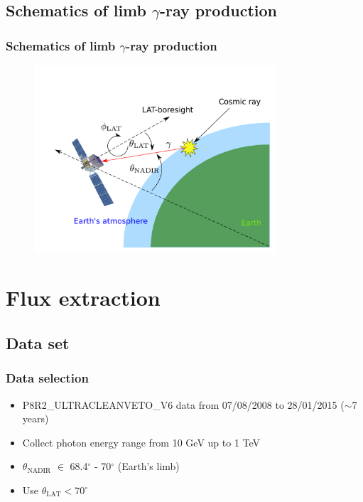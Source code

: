 \documentclass{beamer}
\begin{document}
\subsection{Schematics of limb $\gamma$-ray production}
\begin{frame}
\frametitle{Schematics of limb $\gamma$-ray production}
\centering
\begin{figure}[h!]
\includegraphics[width = 0.8\textwidth]{lat_production_schematic}
\end{figure}
\end{frame}


\section{Flux extraction}
\subsection{Data set}

\begin{frame}
\frametitle{Data selection}
\begin{itemize}
  \item P8R2\_ULTRACLEANVETO\_V6 data from 07/08/2008 to 28/01/2015 ($\sim$7 years) %
  \item Collect photon energy range from 10 GeV up to 1 TeV
  \item $\theta_{\text{NADIR}}$ $\in$ 68.4$^\circ$  - 70$^\circ$ (Earth's limb)
  \item Use $\theta_{\text{LAT}} < 70^\circ$
\end{itemize}
\end{frame}
\end{document}
